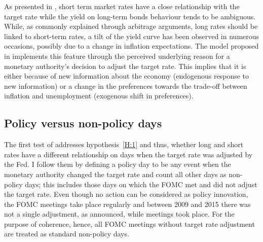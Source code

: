 
As presented in \textcite{Ellingsen.2003}, short term market rates have a close relationship with the target rate while the yield on long-term bonds behaviour tends to be ambiguous. While, as commonly explained through arbitrage arguments, long rates should be linked to short-term rates, a tilt of the yield curve has been observed in numerous occasions, possibly due to a change in inflation expectations. The model proposed in \textcite{Ellingsen.2001} implements this feature through the perceived underlying reason for a monetary authority's decision to adjust the target rate. This implies that it is either because of new information about the economy (endogenous response to new information) or a change in the preferences towards the trade-off between inflation and unemployment (exogenous shift in preferences).

\subsection{Policy versus non-policy days}

The first test of \textcite{Ellingsen.2003} addresses hypothesis~\ref{H:1} and thus, whether long and short rates have a different relationship on days when the target rate was adjusted by the Fed. I follow them by defining a policy day to be any event when the monetary authority changed the target rate and count all other days as non-policy days; this includes those days on which the FOMC met and did not adjust the target rate. Even though no action can be considered as policy innovation, the FOMC meetings take place regularly and between 2009 and 2015 there was not a single adjustment, as announced, while meetings took place. For the purpose of coherence, hence, all FOMC meetings without target rate adjustment are treated as standard non-policy days. 

